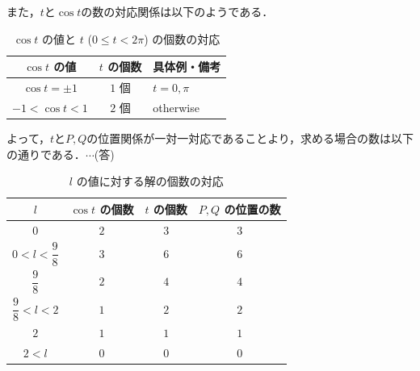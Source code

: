 \documentclass[../../main.tex]{subfiles}
\begin{document}
また，$t$と$\cos t$の数の対応関係は以下のようである．

\begin{table}[htb]
  \centering
  \caption{$\cos t$ の値と $t$ ($0 \le t < 2\pi$) の個数の対応}
  \label{tab:cos_t_correspondence}
  \renewcommand{\arraystretch}{1.3}
  \begin{tabular}{c|c|l}
    \hline
    $\cos t$ の値 & $t$ の個数 & \multicolumn{1}{c}{具体例・備考} \\ \hline
    $\cos t = \pm 1 $ & $1$ 個 & $t = 0, \pi$ \\ \hline
    $-1 < \cos t < 1$ & $2$ 個 & otherwise \\ \hline
  \end{tabular}
\end{table}

よって，$t$と$P, Q$の位置関係が一対一対応であることより，求める場合の数は以下の通りである．$\cdots$(答)

\begin{table}[htb]
  \centering
  \caption{$l$ の値に対する解の個数の対応}
  \label{tab:l_solution_counts}
  \renewcommand{\arraystretch}{1.3}
  \begin{tabular}{c|c|c|c}
    \hline
    $l$ & $\cos t$ の個数 & $t$ の個数 & $P, Q$ の位置の数 \\ \hline
    $0$ & $2$ & $3$ & $3$ \\ \hline
    $0 < l < \dfrac{9}{8}$ & $3$ & $6$ & $6$ \\ \hline
    $\dfrac{9}{8}$ & $2$ & $4$ & $4$ \\ \hline
    $\dfrac{9}{8} < l < 2$ & $1$ & $2$ & $2$ \\ \hline
    $2$ & $1$ & $1$ & $1$ \\ \hline
    $2 < l$ & $0$ & $0$ & $0$ \\ \hline
  \end{tabular}
\end{table}

\newpage
\end{document}
